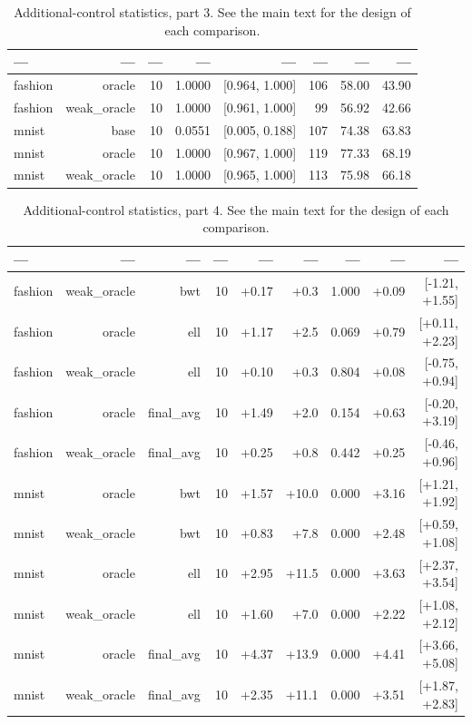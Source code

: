 \documentclass[10pt]{article}
\begin{document}
\begin{table}[h]
\centering\scriptsize
\caption{Additional-control statistics, part 3. See the main text for the design of each comparison.}
\label{tab:sup-s5-3}
\begin{tabular}{lrrrrrrr}
\toprule
--- & --- & --- & --- & --- & --- & --- & --- \\
\midrule
fashion & oracle & 10 & 1.0000 & [0.964, 1.000] & 106 & 58.00 & 43.90 \\
fashion & weak\_oracle & 10 & 1.0000 & [0.961, 1.000] & 99 & 56.92 & 42.66 \\
mnist & base & 10 & 0.0551 & [0.005, 0.188] & 107 & 74.38 & 63.83 \\
mnist & oracle & 10 & 1.0000 & [0.967, 1.000] & 119 & 77.33 & 68.19 \\
mnist & weak\_oracle & 10 & 1.0000 & [0.965, 1.000] & 113 & 75.98 & 66.18 \\
\bottomrule
\end{tabular}
\end{table}

\begin{table}[h]
\centering\scriptsize
\caption{Additional-control statistics, part 4. See the main text for the design of each comparison.}
\label{tab:sup-s5-4}
\begin{tabular}{lrrrrrrrr}
\toprule
--- & --- & --- & --- & --- & --- & --- & --- & --- \\
\midrule
fashion & weak\_oracle & bwt & 10 & +0.17 & +0.3 & 1.000 & +0.09 & [-1.21, +1.55] \\
fashion & oracle & ell & 10 & +1.17 & +2.5 & 0.069 & +0.79 & [+0.11, +2.23] \\
fashion & weak\_oracle & ell & 10 & +0.10 & +0.3 & 0.804 & +0.08 & [-0.75, +0.94] \\
fashion & oracle & final\_avg & 10 & +1.49 & +2.0 & 0.154 & +0.63 & [-0.20, +3.19] \\
fashion & weak\_oracle & final\_avg & 10 & +0.25 & +0.8 & 0.442 & +0.25 & [-0.46, +0.96] \\
mnist & oracle & bwt & 10 & +1.57 & +10.0 & 0.000 & +3.16 & [+1.21, +1.92] \\
mnist & weak\_oracle & bwt & 10 & +0.83 & +7.8 & 0.000 & +2.48 & [+0.59, +1.08] \\
mnist & oracle & ell & 10 & +2.95 & +11.5 & 0.000 & +3.63 & [+2.37, +3.54] \\
mnist & weak\_oracle & ell & 10 & +1.60 & +7.0 & 0.000 & +2.22 & [+1.08, +2.12] \\
mnist & oracle & final\_avg & 10 & +4.37 & +13.9 & 0.000 & +4.41 & [+3.66, +5.08] \\
mnist & weak\_oracle & final\_avg & 10 & +2.35 & +11.1 & 0.000 & +3.51 & [+1.87, +2.83] \\
\bottomrule
\end{tabular}
\end{table}
\end{document}
